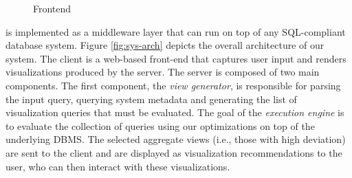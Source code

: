 \begin{figure}[htb]
\centerline{
\hbox{}}
\caption{\SeeDB Frontend}
\vspace{-12pt}
\label{fig:frontend1}
\end{figure} 

\SeeDB is implemented as a middleware layer that can run on
top of any SQL-compliant database system. 
Figure \ref{fig:sys-arch} depicts the overall architecture of our
system.  The \SeeDB client is a web-based front-end that captures user
input and renders visualizations produced by the \SeeDB server.  The
\SeeDB server is composed of two main components. The first
component, the {\it view generator}, is responsible for parsing the
input query, querying system metadata and generating the list of
visualization queries that must be evaluated.  
The goal of the {\em execution engine} is to evaluate the collection of queries
 using our optimizations on top of
the underlying DBMS.
The selected aggregate views (i.e., those with high deviation) 
are sent to the \SeeDB client 
and are displayed as visualization recommendations to the user, 
who can then interact with these
visualizations.

